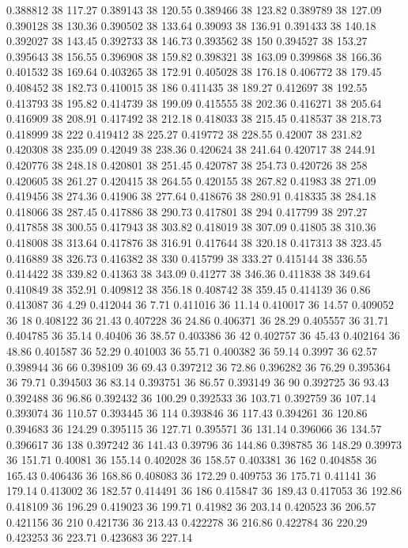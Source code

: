 0.388812 38 117.27
0.389143 38 120.55
0.389466 38 123.82
0.389789 38 127.09
0.390128 38 130.36
0.390502 38 133.64
0.39093 38 136.91
0.391433 38 140.18
0.392027 38 143.45
0.392733 38 146.73
0.393562 38 150
0.394527 38 153.27
0.395643 38 156.55
0.396908 38 159.82
0.398321 38 163.09
0.399868 38 166.36
0.401532 38 169.64
0.403265 38 172.91
0.405028 38 176.18
0.406772 38 179.45
0.408452 38 182.73
0.410015 38 186
0.411435 38 189.27
0.412697 38 192.55
0.413793 38 195.82
0.414739 38 199.09
0.415555 38 202.36
0.416271 38 205.64
0.416909 38 208.91
0.417492 38 212.18
0.418033 38 215.45
0.418537 38 218.73
0.418999 38 222
0.419412 38 225.27
0.419772 38 228.55
0.42007 38 231.82
0.420308 38 235.09
0.42049 38 238.36
0.420624 38 241.64
0.420717 38 244.91
0.420776 38 248.18
0.420801 38 251.45
0.420787 38 254.73
0.420726 38 258
0.420605 38 261.27
0.420415 38 264.55
0.420155 38 267.82
0.41983 38 271.09
0.419456 38 274.36
0.41906 38 277.64
0.418676 38 280.91
0.418335 38 284.18
0.418066 38 287.45
0.417886 38 290.73
0.417801 38 294
0.417799 38 297.27
0.417858 38 300.55
0.417943 38 303.82
0.418019 38 307.09
0.41805 38 310.36
0.418008 38 313.64
0.417876 38 316.91
0.417644 38 320.18
0.417313 38 323.45
0.416889 38 326.73
0.416382 38 330
0.415799 38 333.27
0.415144 38 336.55
0.414422 38 339.82
0.41363 38 343.09
0.41277 38 346.36
0.411838 38 349.64
0.410849 38 352.91
0.409812 38 356.18
0.408742 38 359.45
0.414139 36 0.86
0.413087 36 4.29
0.412044 36 7.71
0.411016 36 11.14
0.410017 36 14.57
0.409052 36 18
0.408122 36 21.43
0.407228 36 24.86
0.406371 36 28.29
0.405557 36 31.71
0.404785 36 35.14
0.40406 36 38.57
0.403386 36 42
0.402757 36 45.43
0.402164 36 48.86
0.401587 36 52.29
0.401003 36 55.71
0.400382 36 59.14
0.3997 36 62.57
0.398944 36 66
0.398109 36 69.43
0.397212 36 72.86
0.396282 36 76.29
0.395364 36 79.71
0.394503 36 83.14
0.393751 36 86.57
0.393149 36 90
0.392725 36 93.43
0.392488 36 96.86
0.392432 36 100.29
0.392533 36 103.71
0.392759 36 107.14
0.393074 36 110.57
0.393445 36 114
0.393846 36 117.43
0.394261 36 120.86
0.394683 36 124.29
0.395115 36 127.71
0.395571 36 131.14
0.396066 36 134.57
0.396617 36 138
0.397242 36 141.43
0.39796 36 144.86
0.398785 36 148.29
0.39973 36 151.71
0.40081 36 155.14
0.402028 36 158.57
0.403381 36 162
0.404858 36 165.43
0.406436 36 168.86
0.408083 36 172.29
0.409753 36 175.71
0.41141 36 179.14
0.413002 36 182.57
0.414491 36 186
0.415847 36 189.43
0.417053 36 192.86
0.418109 36 196.29
0.419023 36 199.71
0.41982 36 203.14
0.420523 36 206.57
0.421156 36 210
0.421736 36 213.43
0.422278 36 216.86
0.422784 36 220.29
0.423253 36 223.71
0.423683 36 227.14
